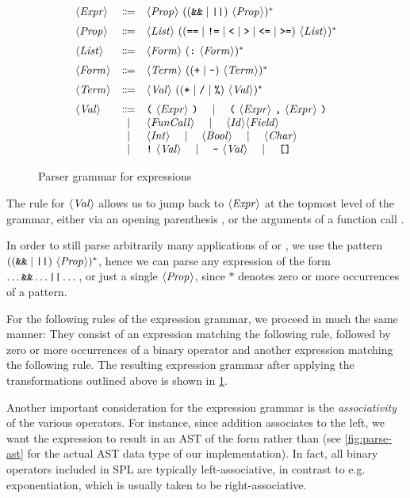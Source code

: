 \begin{figure}[th]
  \[
  \begin{array}{lcl}
		\NT{Expr} & \Coloneqq & \NT{Prop}\ ((\code{\&\&} \mid \code{||})\ \NT{Prop})^* \br
		\NT{Prop} & \Coloneqq & \NT{List}\ ((\code{==} \mid \code{!=} \mid \code{<} \mid \code{>} \mid \code{<=} \mid \code{>=})\ \NT{List})^* \br
		\NT{List} & \Coloneqq & \NT{Form}\ (\code{:}\ \NT{Form})^* \br
		\NT{Form} & \Coloneqq & \NT{Term}\ (( \code{+} \mid \code{-} )\ \NT{Term})^* \br
		\NT{Term} & \Coloneqq & \NT{Val}\ (( \code{*} \mid \code{/} \mid \code{\%} )\ \NT{Val} )^* \br
		\NT{Val} & \Coloneqq & \code{(}\ \NT{Expr}\ \code{)} \ruleSep
      \code{(}\ \NT{Expr}\ \code{,}\ \NT{Expr}\ \code{)} \\
		& \mid & \NT{FunCall} \ruleSep
      \NT{Id} \NT{Field} \\
    & \mid & \NT{Int} \ruleSep \NT{Bool} \ruleSep \NT{Char} \\
		& \mid & \code{!}\ \NT{Val} \ruleSep \code{-}\ \NT{Val} \ruleSep \code{[]}
  \end{array}
  \]
  \caption{Parser grammar for expressions}
  \label{fig:new-expr-grammar}
\end{figure}
%

The rule for $\langle \textit{Val}\kern.7pt \rangle$ allows us to jump back to $\langle \textit{Expr}\kern.7pt \rangle$ at the topmost
level of the grammar, either via an opening parenthesis \spl{(}, or the
arguments of a function call .

In order to still parse arbitrarily many applications of \code{\&\&} or
\code{||}, we use the pattern $((\texttt{\&\&} \mid \texttt{||})\ \langle \textit{Prop}\kern.7pt \rangle)^*$,
hence we can parse any expression of the form $\dots \texttt{\&\&} \dots \texttt{||} \dots$,
or just a single $\langle \textit{Prop}\kern.7pt \rangle$, since $*$ denotes zero or more occurrences of
a pattern.

For the following rules of the expression grammar, we proceed in much the same
manner: They consist of an expression matching the following rule, followed
by zero or more occurrences of a binary operator and another expression matching
the following rule. The resulting expression grammar after applying the
transformations outlined above is shown in \cref{fig:new-expr-grammar}.


Another important consideration for the expression grammar is the
\emph{associativity} of the various operators. For instance, since addition
associates to the left, we want the expression  to result in an AST
of the form  rather than  (see
\cref{fig:parse-ast} for the actual AST data type of our implementation).
In fact, all binary operators included in SPL are typically left-associative, in
contrast to e.g. exponentiation, which is usually taken to be right-associative.

